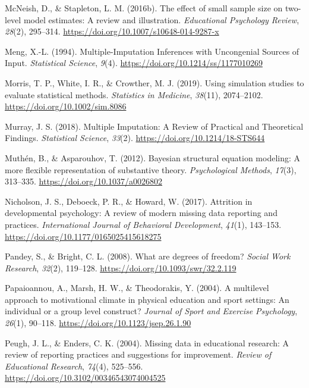 \documentclass[
  letterpaper,
  11pt,
  english,
  singlespacing,
  headsepline,
  openany]{MastersDoctoralThesis}
\newlength{\cslhangindent}
\newenvironment{CSLReferences}[2] %
 {\begin{list}{}{%
  \setlength{\itemindent}{0pt}
  \setlength{\leftmargin}{0pt}
  \setlength{\parsep}{0pt}
  \ifodd #1
   \setlength{\leftmargin}{\cslhangindent}
   \setlength{\itemindent}{-1\cslhangindent}
  \fi
  \setlength{\itemsep}{#2\baselineskip}}}
 {\end{list}}
\begin{document}
\begin{CSLReferences}{1}{0}
McNeish, D., \& Stapleton, L. M. (2016b). The effect of small sample
size on two-level model estimates: A review and illustration.
\emph{Educational Psychology Review}, \emph{28}(2), 295--314.
\url{https://doi.org/10.1007/s10648-014-9287-x}

Meng, X.-L. (1994). Multiple-{Imputation Inferences} with {Uncongenial
Sources} of {Input}. \emph{Statistical Science}, \emph{9}(4).
\url{https://doi.org/10.1214/ss/1177010269}

Morris, T. P., White, I. R., \& Crowther, M. J. (2019). Using simulation
studies to evaluate statistical methods. \emph{Statistics in Medicine},
\emph{38}(11), 2074--2102. \url{https://doi.org/10.1002/sim.8086}

Murray, J. S. (2018). Multiple {Imputation}: {A Review} of {Practical}
and {Theoretical Findings}. \emph{Statistical Science}, \emph{33}(2).
\url{https://doi.org/10.1214/18-STS644}

Muthén, B., \& Asparouhov, T. (2012). Bayesian structural equation
modeling: A more flexible representation of substantive theory.
\emph{Psychological Methods}, \emph{17}(3), 313--335.
\url{https://doi.org/10.1037/a0026802}

Nicholson, J. S., Deboeck, P. R., \& Howard, W. (2017). Attrition in
developmental psychology: {A} review of modern missing data reporting
and practices. \emph{International Journal of Behavioral Development},
\emph{41}(1), 143--153. \url{https://doi.org/10.1177/0165025415618275}

Pandey, S., \& Bright, C. L. (2008). What are degrees of freedom?
\emph{Social Work Research}, \emph{32}(2), 119--128.
\url{https://doi.org/10.1093/swr/32.2.119}

Papaioannou, A., Marsh, H. W., \& Theodorakis, Y. (2004). A multilevel
approach to motivational climate in physical education and sport
settings: {An} individual or a group level construct? \emph{Journal of
Sport and Exercise Psychology}, \emph{26}(1), 90--118.
\url{https://doi.org/10.1123/jsep.26.1.90}

Peugh, J. L., \& Enders, C. K. (2004). Missing data in educational
research: A review of reporting practices and suggestions for
improvement. \emph{Review of Educational Research}, \emph{74}(4),
525--556. \url{https://doi.org/10.3102/00346543074004525}


\end{CSLReferences}
\end{document}
